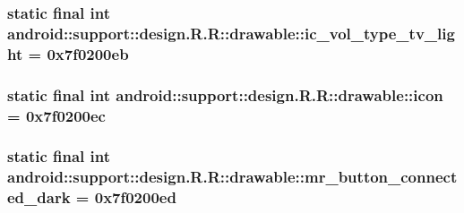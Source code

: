 \hypertarget{classandroid_1_1support_1_1design_1_1_r_1_1drawable_36543d0ffb3472a059698cba0d1e0650}{
\subsubsection[{ic\_\-vol\_\-type\_\-tv\_\-light}]{\setlength{\rightskip}{0pt plus 5cm}static final int android::support::design.R.R::drawable::ic\_\-vol\_\-type\_\-tv\_\-light = 0x7f0200eb}}
\label{classandroid_1_1support_1_1design_1_1_r_1_1drawable_36543d0ffb3472a059698cba0d1e0650}


\hypertarget{classandroid_1_1support_1_1design_1_1_r_1_1drawable_5759cea0f049371b8a3dadd56581820e}{
\subsubsection[{icon}]{\setlength{\rightskip}{0pt plus 5cm}static final int android::support::design.R.R::drawable::icon = 0x7f0200ec}}
\label{classandroid_1_1support_1_1design_1_1_r_1_1drawable_5759cea0f049371b8a3dadd56581820e}


\hypertarget{classandroid_1_1support_1_1design_1_1_r_1_1drawable_9a874303c3d1c18925995fd8c054d3d9}{
\subsubsection[{mr\_\-button\_\-connected\_\-dark}]{\setlength{\rightskip}{0pt plus 5cm}static final int android::support::design.R.R::drawable::mr\_\-button\_\-connected\_\-dark = 0x7f0200ed}}
\label{classandroid_1_1support_1_1design_1_1_r_1_1drawable_9a874303c3d1c18925995fd8c054d3d9}


